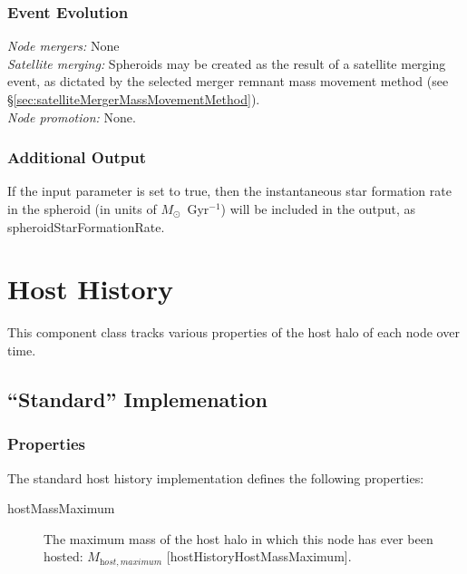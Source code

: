 \subsubsection{Event Evolution}

\noindent\emph{Node mergers:} None\\

\noindent\emph{Satellite merging:} Spheroids may be created as the result of a satellite merging event, as dictated by the selected merger remnant mass movement method (see \S\ref{sec:satelliteMergerMassMovementMethod}).\\

\noindent\emph{Node promotion:} None.\\

\subsubsection{Additional Output}

If the {\normalfont \ttfamily [spheroidOutputStarFormationRate]} input parameter is set to true, then the instantaneous star formation rate in the spheroid (in units of $M_\odot$~Gyr$^{-1}$) will be included in the output, as {\normalfont \ttfamily spheroidStarFormationRate}.

\section{Host History}

This component class tracks various properties of the host halo of each \gls{node} over time.

\subsection{``Standard'' Implemenation}

\subsubsection{Properties}

The standard host history implementation defines the following properties:
\begin{description}
 \item [{\normalfont \ttfamily hostMassMaximum}] The maximum mass of the host halo in which this node has ever been hosted: $M_{\mathrm host, maximum}$ [{\normalfont \ttfamily hostHistoryHostMassMaximum}].
\end{description}

